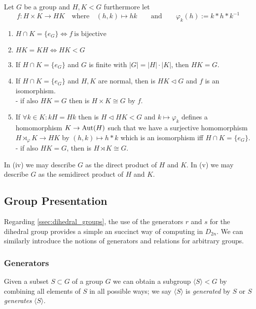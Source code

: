\begin{proposition}\label{pro:dir_semidir_prod}
   Let \(G\) be a group and \(H, K < G\) furthermore let
   \[f: H \times K \to HK \quad\text{where}\quad (h,k) \mapsto hk \qquad\text{and}\qquad \varphi_k(h) := k \ast h \ast k^{-1}\]

   \begin{enumerate}[label=\roman*, align=Center]
      \item \(H \cap K = \{e_G\} \iff f~\text{is bijective}\)
      \item \(HK = KH \iff HK < G\)
      \item If \(H \cap K = \{e_G\}\) and \(G\) is finite with \(|G| = |H| \cdot |K|\), then \(HK = G\).
      \item If \(H \cap K = \{e_G\}\) and \(H, K\) are normal, then is \(HK \triangleleft G\) and \(f\) is an isomorphism. \\
      - if also \(HK = G\) then is \(H \times K \cong G\) by \(f\).
      \item If \(\forall k \in K: kH = Hk\) then is \(H \triangleleft HK < G\) and \(k \mapsto \varphi_k\) defines a homomorphism \(K \to \operatorname{Aut}(H)\) such that we have a surjective homomorphism \(H \rtimes_{\varphi} K \to HK\) by \((h,k) \mapsto h \ast k\) which is an isomorphism iff \(H \cap K = \{e_G\}\). \\
      - if also \(HK = G\), then is \(H \rtimes K \cong G\).
   \end{enumerate}
\end{proposition}
\begin{remark}
   In (iv) we may describe \(G\) as the direct product of \(H\) and \(K\).
   In (v) we may describe \(G\) as the semidirect product of \(H\) and \(K\).
\end{remark}

\subsection{Group Presentation}
Regarding \cref{ssec:dihedral_groups}, the use of the generators \(r\) and \(s\) for the dihedral group provides a simple an succinct way of computing in \(D_{2n}\).
We can similarly introduce the notions of generators and relations for arbitrary groups.

\subsubsection{Generators}
Given a subset \(S \subset G\) of a group \(G\) we can obtain a subgroup \(\langle S \rangle < G\) by combining all elements of \(S\) in all possible ways; we say \(\langle S \rangle\) is \emph{generated} by \(S\) or \(S\) \emph{generates} \(\langle S\rangle\).

